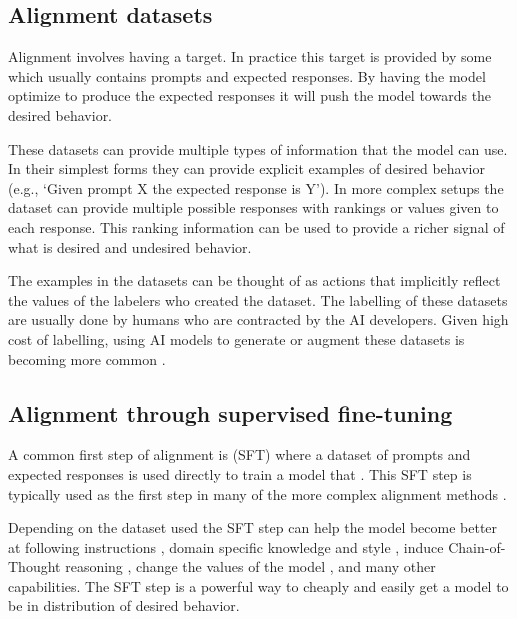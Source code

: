 \subsection{Alignment datasets}

Alignment involves having a target. In practice this target is provided by some  which usually contains prompts and expected responses. By having the model optimize to produce the expected responses it will push the model towards the desired behavior.

These datasets can provide multiple types of information that the model can use. In their simplest forms they can provide explicit examples of desired behavior (e.g., \enquote*{Given prompt X the expected response is Y}). In more complex setups the dataset can provide multiple possible responses with rankings or values given to each response. This ranking information can be used to provide a richer signal of what is desired and undesired behavior.

The examples in the datasets can be thought of as actions that implicitly reflect the values of the labelers who created the dataset. The labelling of these datasets are usually done by humans who are contracted by the AI developers. Given high cost of labelling, using AI models to generate or augment these datasets is becoming more common \cite{baiConstitutionalAIHarmlessness2022, casperOpenProblemsFundamental2023,leeRLAIFVsRLHF2024}.

\subsection{Alignment through supervised fine-tuning}

A common first step of alignment is  (SFT) where a dataset of prompts and expected responses is used directly to train a model that . This SFT step is typically used as the first step in many of the more complex alignment methods \cite{ouyangTrainingLanguageModels2022,rafailovDirectPreferenceOptimization2024,baiConstitutionalAIHarmlessness2022,leeRLAIFVsRLHF2024}.

Depending on the dataset used the SFT step can help the model become better at following instructions \cite{ouyangTrainingLanguageModels2022}, domain specific knowledge and style \cite{liChatDoctorMedicalChat2023}, induce Chain-of-Thought reasoning \cite{weiChainofThoughtPromptingElicits2023}, change the values of the model \cite{nieSurveytoBehaviorDownstreamAlignment2025}, and many other capabilities. The SFT step is a powerful way to cheaply and easily get a model to be in distribution of desired behavior.

